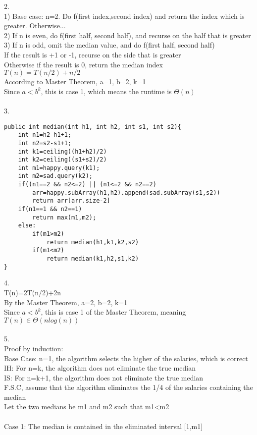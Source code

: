 \documentclass[a4paper,12pt]{article}
\begin{document}
2. \\
1) Base case: n=2. Do f(first index,second index) and return the index which is greater. Otherwise...\\
2) If n is even, do f(first half, second half), and recurse on the half that is greater\\
3) If n is odd, omit the median value, and do f(first half, second half)\\
	If the result is +1 or -1, recurse on the side that is greater\\
	Otherwise if the result is 0, return the median index\\
$T(n)=T(n/2)+n/2$\\
According to Master Theorem, a=1, b=2, k=1\\
Since $a<b^k$, this is case 1, which means the runtime is $\Theta(n)$\\\\
3. 
\begin{lstlisting}
public int median(int h1, int h2, int s1, int s2){
	int n1=h2-h1+1;
	int n2=s2-s1+1;
	int k1=ceiling((h1+h2)/2)
	int k2=ceiling((s1+s2)/2)
	int m1=happy.query(k1);
	int m2=sad.query(k2);
	if((n1==2 && n2<=2) || (n1<=2 && n2==2)
		arr=happy.subArray(h1,h2).append(sad.subArray(s1,s2))
		return arr[arr.size-2]	
	if(n1==1 && n2==1)
		return max(m1,m2);
	else:
		if(m1>m2)
			return median(h1,k1,k2,s2)
		if(m1<m2)
			return median(k1,h2,s1,k2)
} 
\end{lstlisting}
4. \\
T(n)=2T(n/2)+2n\\
By the Master Theorem, a=2, b=2, k=1\\
Since $a<b^k$, this is case 1 of the Master Theorem, meaning $T(n)\in\Theta(nlog(n))$\\\\
5. \\
Proof by induction:\\
Base Case: n=1, the algorithm selects the higher of the salaries, which is correct\\
IH: For n=k, the algorithm does not eliminate the true median\\
IS: For n=k+1, the algorithm does not eliminate the true median\\
F.S.C, assume that the algorithm eliminates the 1/4 of the salaries containing the median\\
Let the two medians be m1 and m2 such that m1<m2\\\\
Case 1: The median is contained in the eliminated interval [1,m1]\\
\end{document}
